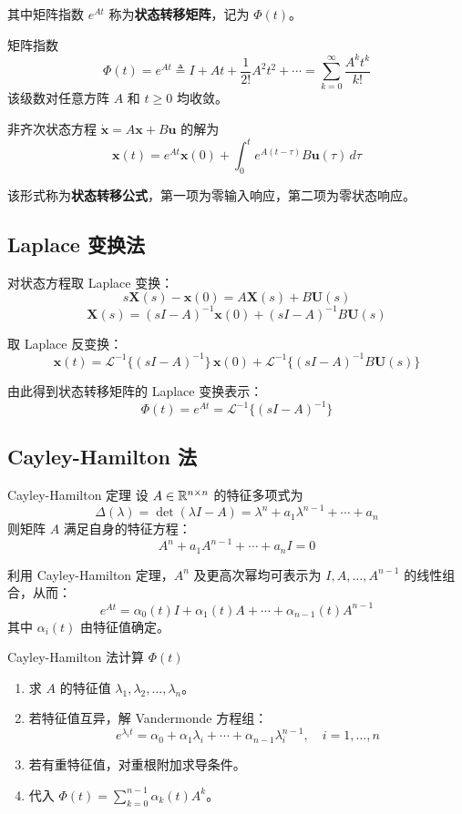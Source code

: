 其中矩阵指数 $e^{At}$ 称为\textbf{状态转移矩阵}，记为 $\Phi(t)$。

\begin{mydefinition}{矩阵指数}
\[
\Phi(t) = e^{At} \triangleq I + At + \frac{1}{2!}A^2 t^2 + \cdots = \sum_{k=0}^{\infty} \frac{A^k t^k}{k!}
\]
该级数对任意方阵 $A$ 和 $t \geq 0$ 均收敛。
\end{mydefinition}

非齐次状态方程 $\dot{\mathbf{x}} = A\mathbf{x} + B\mathbf{u}$ 的解为
\[
\mathbf{x}(t) = e^{At}\mathbf{x}(0) + \int_0^t e^{A(t-\tau)} B\mathbf{u}(\tau)\,d\tau
\]

该形式称为\textbf{状态转移公式}，第一项为零输入响应，第二项为零状态响应。

\subsection{Laplace 变换法}

对状态方程取 Laplace 变换：
\[
s\mathbf{X}(s) - \mathbf{x}(0) = A\mathbf{X}(s) + B\mathbf{U}(s)
\]
\[
\mathbf{X}(s) = (sI - A)^{-1}\mathbf{x}(0) + (sI - A)^{-1}B\mathbf{U}(s)
\]

取 Laplace 反变换：
\[
\mathbf{x}(t) = \mathcal{L}^{-1}\{(sI-A)^{-1}\}\,\mathbf{x}(0) + \mathcal{L}^{-1}\{(sI-A)^{-1}B\mathbf{U}(s)\}
\]

由此得到状态转移矩阵的 Laplace 变换表示：
\[
\Phi(t) = e^{At} = \mathcal{L}^{-1}\{(sI - A)^{-1}\}
\]

\subsection{Cayley-Hamilton 法}

\begin{myTheorem}{Cayley-Hamilton 定理}
设 $A \in \mathbb{R}^{n \times n}$ 的特征多项式为
\[
\Delta(\lambda) = \det(\lambda I - A) = \lambda^n + a_1\lambda^{n-1} + \cdots + a_n
\]
则矩阵 $A$ 满足自身的特征方程：
\[
A^n + a_1 A^{n-1} + \cdots + a_n I = 0
\]
\end{myTheorem}

利用 Cayley-Hamilton 定理，$A^n$ 及更高次幂均可表示为 $I, A, \ldots, A^{n-1}$ 的线性组合，从而：
\[
e^{At} = \alpha_0(t)I + \alpha_1(t)A + \cdots + \alpha_{n-1}(t)A^{n-1}
\]
其中 $\alpha_i(t)$ 由特征值确定。

\begin{myalgorithm}{Cayley-Hamilton 法计算 $\Phi(t)$}
\begin{enumerate}
    \item 求 $A$ 的特征值 $\lambda_1,\lambda_2,\ldots,\lambda_n$。
    \item 若特征值互异，解 Vandermonde 方程组：
    \[
    e^{\lambda_i t} = \alpha_0 + \alpha_1\lambda_i + \cdots + \alpha_{n-1}\lambda_i^{n-1},\quad i=1,\ldots,n
    \]
    \item 若有重特征值，对重根附加求导条件。
    \item 代入 $\Phi(t) = \sum_{k=0}^{n-1} \alpha_k(t) A^k$。
\end{enumerate}
\end{myalgorithm}

